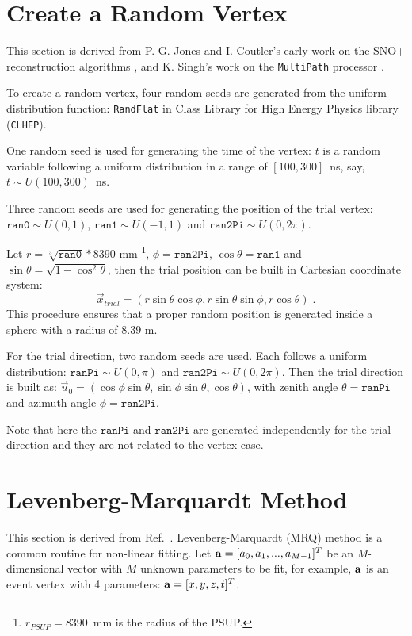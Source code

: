 \section{Create a Random Vertex}\label{appendix:random_gen}

This section is derived from P. G. Jones and I. Coutler's early work on the SNO+ reconstruction algorithms \cite{jones2011background,coulter2013modelling}, and K. Singh's work on the \texttt{MultiPath} processor \cite{kalpanaMPFitter}.

To create a random vertex, four random seeds are generated from the uniform distribution function: \texttt{RandFlat} in Class Library for High Energy Physics library (\texttt{CLHEP}).

One random seed is used for generating the time of the vertex: $t$ is a random variable following a uniform distribution in a range of $[100, 300]$~ns, say, $t\sim U(100,300)$~ns.

Three random seeds are used for generating the position of the trial vertex: $\texttt{ran0}\sim U(0,1)$, $\texttt{ran1}\sim U(-1,1)$ and $\texttt{ran2Pi}\sim U(0,2\pi)$.

Let $r=\sqrt[3]{\texttt{ran0}}*8390$ mm \footnote{$r_{PSUP}=8390$~mm is the radius of the PSUP.}, $\phi=\texttt{ran2Pi}$, $\cos\theta=\texttt{ran1}$ and $\sin\theta=\sqrt{1-{\cos^2\theta}}$, then the trial position can be built in Cartesian coordinate system:
\begin{equation*} 
 \vec{x}_{trial}=(r\sin\theta\cos\phi, r\sin\theta\sin\phi, r\cos\theta)\;.
 \end{equation*}
This procedure ensures that a proper random position is generated inside a sphere with a radius of $8.39$ m.

For the trial direction, two random seeds are used. Each follows a uniform distribution: $\texttt{ranPi}\sim U(0,\pi)$ and $\texttt{ran2Pi}\sim U(0,2\pi)$. Then the trial direction is built as: $\vec{u}_{0}=(\cos\phi\sin\theta,\sin\phi\sin\theta,\cos\theta)$, with zenith angle $\theta=\texttt{ranPi}$ and azimuth angle $\phi=\texttt{ran2Pi}$.

Note that here the $\texttt{ranPi}$ and $\texttt{ran2Pi}$ are generated independently for the trial direction and they are not related to the vertex case.

\section[Levenberg-Marquardt Method]{Levenberg-Marquardt Method}\label{appendix:MRQ}
This section is derived from Ref.~\cite{press2007numerical}. Levenberg-Marquardt (MRQ) method is a common routine for non-linear fitting. Let ${\bf a} = [a_0, a_1, ..., a_{M-1}]^T$ be an $M$-dimensional vector with $M$ unknown parameters to be fit, for example, $\bf a$ is an event vertex with 4 parameters: ${\bf a}=[x,y,z,t]^T$.


